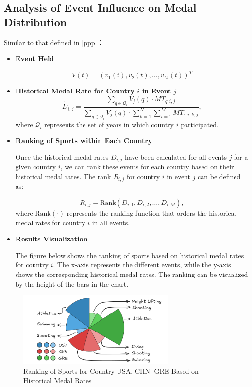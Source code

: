 \documentclass{mcmthesis}
\begin{document}
\subsection{Analysis of Event Influence on Medal Distribution}
Similar to that defined in \ref{ppp}：
\begin{itemize}[leftmargin=0.15in, labelsep=0.1in, itemsep=1pt, parsep=0pt]
	\item \textbf{Event Held}
	
	\[
	V(t) = \left( v_1(t), v_2(t), \dots, v_M(t) \right)^T
	\]
	

	
	\item \textbf{Historical Medal Rate for Country \( i \) in Event \( j \)}
	\[
	\tilde{D}_{i,j} = \frac{\sum_{q \in \mathcal{Q}_i} V_j(q) \cdot MT_{q,i,j}}{\sum_{q \in \mathcal{Q}_i} V_j(q) \cdot \sum_{k=1}^{N} \sum_{i=1}^{M} MT_{q,i,k,j}},
	\]
	where \( \mathcal{Q}_i \) represents the set of years in which country \( i \) participated.


	
	\item \textbf{Ranking of Sports within Each Country}
	
	Once the historical medal rates \( D_{i,j} \) have been calculated for all events \( j \) for a given country \( i \), we can rank these events for each country based on their historical medal rates. The rank \( R_{i,j} \) for country \( i \) in event \( j \) can be defined as:
	
	\[
	R_{i,j} = \text{Rank}(D_{i,1}, D_{i,2}, \dots, D_{i,M}),
	\]
	where \( \text{Rank}(\cdot) \) represents the ranking function that orders the historical medal rates for country \( i \) in all events.
	
	\item \textbf{Results Visualization}
	
	The figure below shows the ranking of sports based on historical medal rates for country \( i \). The x-axis represents the different events, while the y-axis shows the corresponding historical medal rates. The ranking can be visualized by the height of the bars in the chart.
\end{itemize}
	\begin{figure}[htbp]
		\centering
		\includegraphics[width=0.7\textwidth]{fig/Rose-Chart.png}
		\caption{Ranking of Sports for Country USA, CHN, GRE Based on Historical Medal Rates}
		\label{fig:ranking}
	\end{figure}
\end{document}
